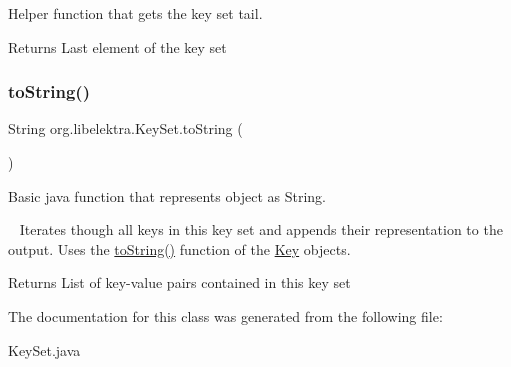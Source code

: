 Helper function that gets the key set tail. 

\begin{DoxyReturn}{Returns}
Last element of the key set 
\end{DoxyReturn}
\mbox{\label{classorg_1_1libelektra_1_1KeySet_a9c1e2918acce8c7cda5be406989c87af}} 
\subsubsection{\texorpdfstring{to\+String()}{toString()}}
{\footnotesize\ttfamily String org.\+libelektra.\+Key\+Set.\+to\+String (\begin{DoxyParamCaption}{ }\end{DoxyParamCaption})\hspace{0.3cm}{\ttfamily [inline]}}



Basic java function that represents object as String. 

~\newline
 Iterates though all keys in this key set and appends their representation to the output. Uses the \hyperlink{classorg_1_1libelektra_1_1KeySet_a9c1e2918acce8c7cda5be406989c87af}{to\+String()} function of the \hyperlink{classorg_1_1libelektra_1_1Key}{Key} objects.

\begin{DoxyReturn}{Returns}
List of key-\/value pairs contained in this key set 
\end{DoxyReturn}


The documentation for this class was generated from the following file\+:\begin{DoxyCompactItemize}
\item 
Key\+Set.\+java\end{DoxyCompactItemize}
